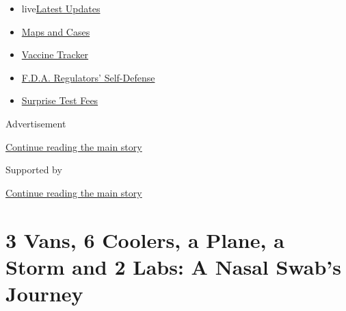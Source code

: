 \begin{itemize}
\tightlist
\item
  live\href{https://www.nytimes3xbfgragh.onion/2020/09/11/world/covid-19-coronavirus.html?name=styln-coronavirus-national\&region=TOP_BANNER\&block=storyline_menu_recirc\&action=click\&pgtype=Article\&impression_id=d7db2fc1-f4b7-11ea-96c6-737460281ea1\&variant=undefined}{Latest
  Updates}
\item
  \href{https://www.nytimes3xbfgragh.onion/interactive/2020/us/coronavirus-us-cases.html?name=styln-coronavirus-national\&region=TOP_BANNER\&block=storyline_menu_recirc\&action=click\&pgtype=Article\&impression_id=d7db2fc2-f4b7-11ea-96c6-737460281ea1\&variant=undefined}{Maps
  and Cases}
\item
  \href{https://www.nytimes3xbfgragh.onion/interactive/2020/science/coronavirus-vaccine-tracker.html?name=styln-coronavirus-national\&region=TOP_BANNER\&block=storyline_menu_recirc\&action=click\&pgtype=Article\&impression_id=d7db2fc3-f4b7-11ea-96c6-737460281ea1\&variant=undefined}{Vaccine
  Tracker}
\item
  \href{https://www.nytimes3xbfgragh.onion/2020/09/10/us/politics/fda-coronavirus-vaccine.html?name=styln-coronavirus-national\&region=TOP_BANNER\&block=storyline_menu_recirc\&action=click\&pgtype=Article\&impression_id=d7db56d0-f4b7-11ea-96c6-737460281ea1\&variant=undefined}{F.D.A.
  Regulators' Self-Defense}
\item
  \href{https://www.nytimes3xbfgragh.onion/2020/09/09/upshot/coronavirus-surprise-test-fees.html?name=styln-coronavirus-national\&region=TOP_BANNER\&block=storyline_menu_recirc\&action=click\&pgtype=Article\&impression_id=d7db56d1-f4b7-11ea-96c6-737460281ea1\&variant=undefined}{Surprise
  Test Fees}
\end{itemize}

Advertisement

\protect\hyperlink{after-top}{Continue reading the main story}

Supported by

\protect\hyperlink{after-sponsor}{Continue reading the main story}

\hypertarget{3-vans-6-coolers-a-plane-a-storm-and-2-labs-a-nasal-swabs-journey}{%
\section{3 Vans, 6 Coolers, a Plane, a Storm and 2 Labs: A Nasal Swab's
Journey}\label{3-vans-6-coolers-a-plane-a-storm-and-2-labs-a-nasal-swabs-journey}}

